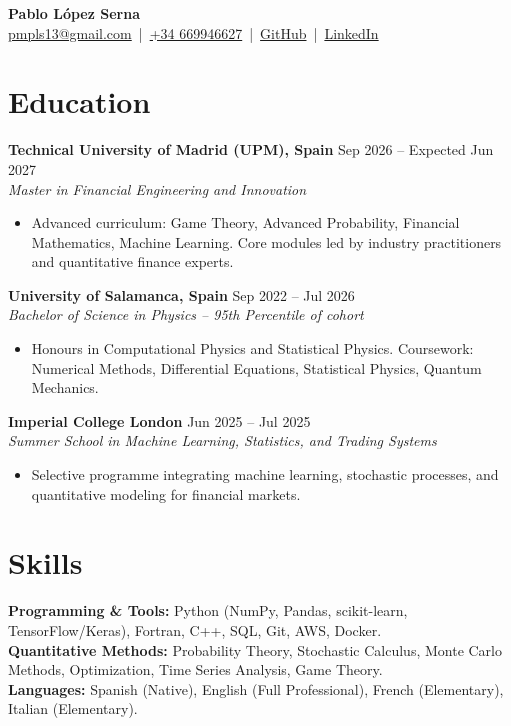 \documentclass[a4paper]{article}
\begin{document}
\pagestyle{empty}
\small

\begin{center}
    {\Huge \textbf{Pablo López Serna}} \\
    \vspace{0.2cm}
    \href{mailto:pmpls13@gmail.com}{pmpls13@gmail.com} \,|\, \href{tel:0034669947627}{+34 669946627} \,|\,
    \href{https://github.com/pablolopse}{GitHub} \,|\,
    \href{https://www.linkedin.com/in/pablolopse/}{LinkedIn}
\end{center}

\vspace{0.12cm}

\section*{Education}

\textbf{Technical University of Madrid (UPM), Spain} \hfill Sep 2026 -- Expected Jun 2027 \\
\textit{Master in Financial Engineering and Innovation}
\begin{itemize}
    \item Advanced curriculum: Game Theory, Advanced Probability, Financial Mathematics, Machine Learning. Core modules led by industry practitioners and quantitative finance experts.
\end{itemize}

\textbf{University of Salamanca, Spain} \hfill Sep 2022 -- Jul 2026 \\
\textit{Bachelor of Science in Physics -- 95th Percentile of cohort}
\begin{itemize}
    \item Honours in Computational Physics and Statistical Physics. Coursework: Numerical Methods, Differential Equations, Statistical Physics, Quantum Mechanics.
\end{itemize}

\textbf{Imperial College London} \hfill Jun 2025 -- Jul 2025 \\
\textit{Summer School in Machine Learning, Statistics, and Trading Systems}
\begin{itemize}
    \item Selective programme integrating machine learning, stochastic processes, and quantitative modeling for financial markets.
\end{itemize}

\vspace{0.08cm}

\section*{Skills}
\textbf{Programming \& Tools:} Python (NumPy, Pandas, scikit-learn, TensorFlow/Keras), Fortran, C++, SQL, Git, AWS, Docker. \\
\textbf{Quantitative Methods:} Probability Theory, Stochastic Calculus, Monte Carlo Methods, Optimization, Time Series Analysis, Game Theory. \\
\textbf{Languages:} Spanish (Native), English (Full Professional), French (Elementary), Italian (Elementary).
\end{document}
